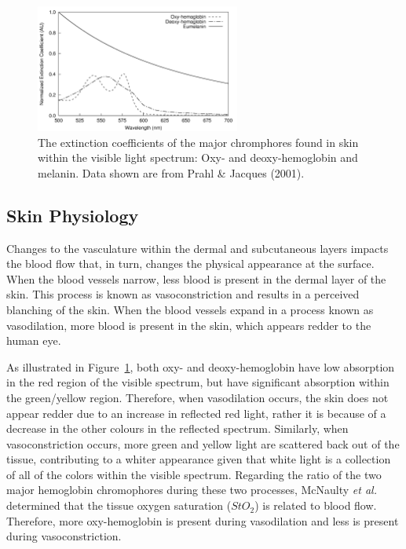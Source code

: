 \begin{figure}
	\centering \includegraphics[width=0.6\textwidth]{figures/intro-skin_chromophores.png}
	\caption[The extinction coefficient spectra for the major chromophores of skin within the visible light spectrum]{\label{fig:intro-skin_chromophores}The extinction coefficients of the major chromphores found in skin within the visible light spectrum: Oxy- and deoxy-hemoglobin and melanin. Data shown are from Prahl \& Jacques (2001).\cite{Prahl2001}}
\end{figure}

\subsection{Skin Physiology}
Changes to the vasculature within the dermal and subcutaneous layers impacts the blood flow that, in turn, changes the physical appearance at the surface. When the blood vessels narrow, less blood is present in the dermal layer of the skin. This process is known as vasoconstriction and results in a perceived blanching of the skin. When the blood vessels expand in a process known as vasodilation, more blood is present in the skin, which appears redder to the human eye.

As illustrated in Figure~\ref{fig:intro-skin_chromophores}, both oxy- and deoxy-hemoglobin have low absorption in the red region of the visible spectrum, but have significant absorption within the green/yellow region. Therefore, when vasodilation occurs, the skin does not appear redder due to an increase in reflected red light, rather it is because of a decrease in the other colours in the reflected spectrum. Similarly, when vasoconstriction occurs, more green and yellow light are scattered back out of the tissue, contributing to a whiter appearance given that white light is a collection of all of the colors within the visible spectrum. Regarding the ratio of the two major hemoglobin chromophores during these two processes, McNaulty \emph{et al.} determined that the tissue oxygen saturation ($StO_2$) is related to blood flow.\cite{McNulty2011} Therefore, more oxy-hemoglobin is present during vasodilation and less is present during vasoconstriction.

